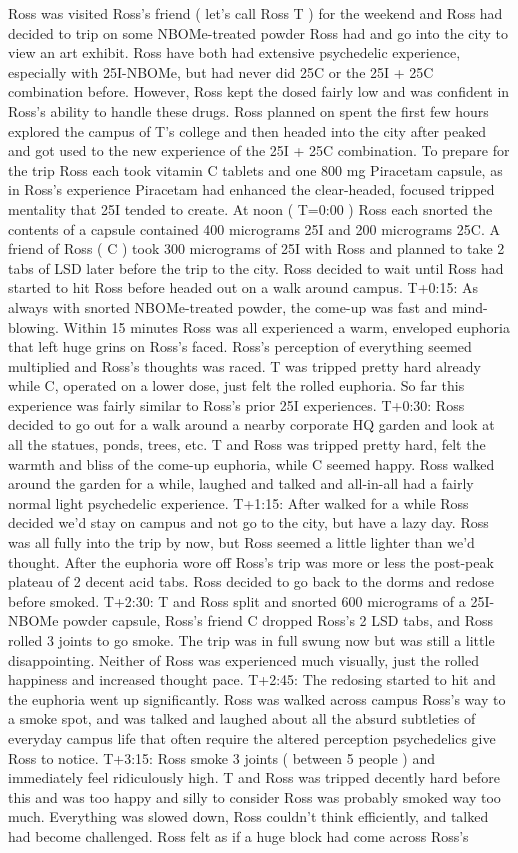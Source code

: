 \documentclass[12pt]{book}
\begin{document}
Ross was visited Ross's friend ( let's call Ross T ) for the weekend and Ross had decided to trip on some NBOMe-treated powder Ross had and go into the city to view an art exhibit. Ross have both had extensive psychedelic experience, especially with 25I-NBOMe, but had never did 25C or the 25I + 25C combination before. However, Ross kept the dosed fairly low and was confident in Ross's ability to handle these drugs. Ross planned on spent the first few hours explored the campus of T's college and then headed into the city after peaked and got used to the new experience of the 25I + 25C combination. To prepare for the trip Ross each took vitamin C tablets and one 800 mg Piracetam capsule, as in Ross's experience Piracetam had enhanced the clear-headed, focused tripped mentality that 25I tended to create. At noon ( T=0:00 ) Ross each snorted the contents of a capsule contained 400 micrograms 25I and 200 micrograms 25C. A friend of Ross ( C ) took 300 micrograms of 25I with Ross and planned to take 2 tabs of LSD later before the trip to the city. Ross decided to wait until Ross had started to hit Ross before headed out on a walk around campus. T+0:15: As always with snorted NBOMe-treated powder, the come-up was fast and mind-blowing. Within 15 minutes Ross was all experienced a warm, enveloped euphoria that left huge grins on Ross's faced. Ross's perception of everything seemed multiplied and Ross's thoughts was raced. T was tripped pretty hard already while C, operated on a lower dose, just felt the rolled euphoria. So far this experience was fairly similar to Ross's prior 25I experiences. T+0:30: Ross decided to go out for a walk around a nearby corporate HQ garden and look at all the statues, ponds, trees, etc. T and Ross was tripped pretty hard, felt the warmth and bliss of the come-up euphoria, while C seemed happy. Ross walked around the garden for a while, laughed and talked and all-in-all had a fairly normal light psychedelic experience. T+1:15: After walked for a while Ross decided we'd stay on campus and not go to the city, but have a lazy day. Ross was all fully into the trip by now, but Ross seemed a little lighter than we'd thought. After the euphoria wore off Ross's trip was more or less the post-peak plateau of 2 decent acid tabs. Ross decided to go back to the dorms and redose before smoked. T+2:30: T and Ross split and snorted 600 micrograms of a 25I-NBOMe powder capsule, Ross's friend C dropped Ross's 2 LSD tabs, and Ross rolled 3 joints to go smoke. The trip was in full swung now but was still a little disappointing. Neither of Ross was experienced much visually, just the rolled happiness and increased thought pace. T+2:45: The redosing started to hit and the euphoria went up significantly. Ross was walked across campus Ross's way to a smoke spot, and was talked and laughed about all the absurd subtleties of everyday campus life that often require the altered perception psychedelics give Ross to notice. T+3:15: Ross smoke 3 joints ( between 5 people ) and immediately feel ridiculously high. T and Ross was tripped decently hard before this and was too happy and silly to consider Ross was probably smoked way too much. Everything was slowed down, Ross couldn't think efficiently, and talked had become challenged. Ross felt as if a huge block had come across Ross's 
\end{document}
